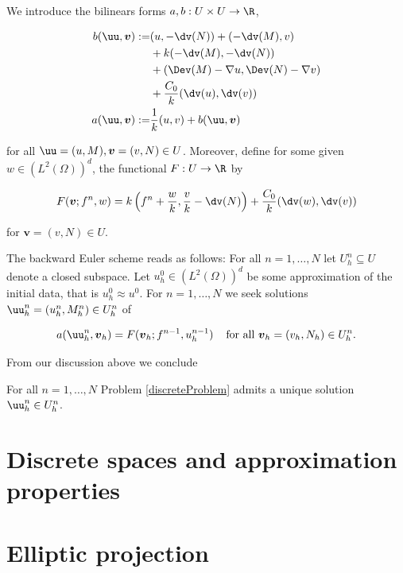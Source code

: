 \vspace{0.3 cm}

We introduce the bilinears forms $a,b:U\times U\to\R$,

\begin{align*}
    b(\uu,\boldsymbol{v}):=&(u,-\dv(N))+(-\dv(M),v)\\
    &+k(-\dv(M),-\dv(N))\\
    &+(\Dev(M)-\nabla u,\Dev(N)-\nabla v)\\
    &+\frac{C_0}{k}(\dv(u),\dv(v))\\
    a(\uu,\boldsymbol{v}):=&\frac{1}{k}(u,v)+b(\uu,\boldsymbol{v})
\end{align*}

for all $\uu=(u,M),\boldsymbol{v}=(v,N)\in U$. Moreover, define for some given $w\in(L^2(\Omega))^d$, the functional $F:U\to\R$ by

$$F(\boldsymbol{v};f^n,w)=k\left(f^n+\frac{w}{k},\frac{v}{k}-\dv(N)\right)+\frac{C_0}{k}(\dv(w),\dv(v))$$

for $\boldsymbol{v}=(v,N)\in U$.

\vspace{0.3 cm}

The backward Euler scheme reads as follows: For all $n=1,\dots,N$ let $U_h^n\subseteq U$ denote a closed subspace. Let $u_h^0\in(L^2(\Omega))^d$ be some approximation of the initial data, that is $u_h^0\approx u^0$. For $n=1,\dots, N$ we seek solutions $\uu_h^n=(u_h^n,M_h^n)\in U_h^n$ of

\begin{equation}\label{discreteProblem}
    a(\uu_h^n,\boldsymbol{v}_h)=F(\boldsymbol{v}_h;f^{n-1},u_h^{n-1})\hspace{0.4 cm}\text{for all } \boldsymbol{v}_h=(v_h,N_h)\in U_h^n.
\end{equation}

From our discussion above we conclude

\begin{teor}
    For all $n=1,\dots,N$ Problem \eqref{discreteProblem} admits a unique solution $\uu_h^n\in U_h^n$.
\end{teor}

\section{Discrete spaces and approximation properties}

\section{Elliptic projection}

